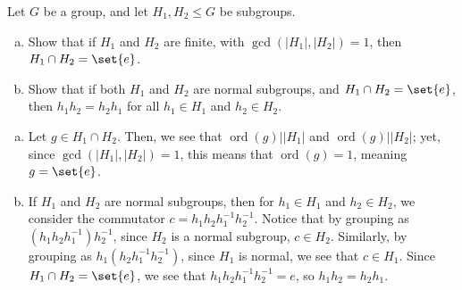 \documentclass[10pt]{mypackage}
\begin{document}
\begin{problem}[Problem 3]
  Let $G$ be a group, and let $H_1,H_2\leq G$ be subgroups.
  \begin{enumerate}[(a)]
    \item Show that if $H_1$ and $H_2$ are finite, with $\gcd\left(\left\vert H_1 \right\vert,\left\vert H_2 \right\vert\right) = 1$, then $H_1\cap H_2 = \set{e}$.
    \item Show that if both $H_1$ and $H_2$ are normal subgroups, and $H_1\cap H_2 = \set{e}$, then $h_1h_2 = h_2h_1$ for all $h_1\in H_1$ and $h_2\in H_2$.
  \end{enumerate}
\end{problem}
\begin{solution}\hfill
  \begin{enumerate}[(a)]
    \item Let $g\in H_1\cap H_2$. Then, we see that $\operatorname{ord}\left( g \right) | \left\vert H_1 \right\vert$ and $\operatorname{ord}\left( g \right) | \left\vert H_2 \right\vert$; yet, since $\gcd\left( \left\vert H_1 \right\vert,\left\vert H_2 \right\vert \right) = 1$, this means that $\operatorname{ord}\left( g \right) = 1$, meaning $g = \set{e}$.
    \item If $H_1$ and $H_2$ are normal subgroups, then for $h_1\in H_1$ and $h_2\in H_2$, we consider the commutator $c = h_1h_2h_1^{-1}h_2^{-1}$. Notice that by grouping as $\left( h_1h_2h_1^{-1} \right)h_2^{-1}$, since $H_2$ is a normal subgroup, $c\in H_2$. Similarly, by grouping as $h_1\left( h_2h_1^{-1}h_2^{-1} \right)$, since $H_1$ is normal, we see that $c\in H_1$. Since $H_1\cap H_2 = \set{e}$, we see that $h_1h_2h_1^{-1}h_2^{-1} = e$, so $h_1h_2 = h_2h_1$.
  \end{enumerate}
\end{solution}
\end{document}

